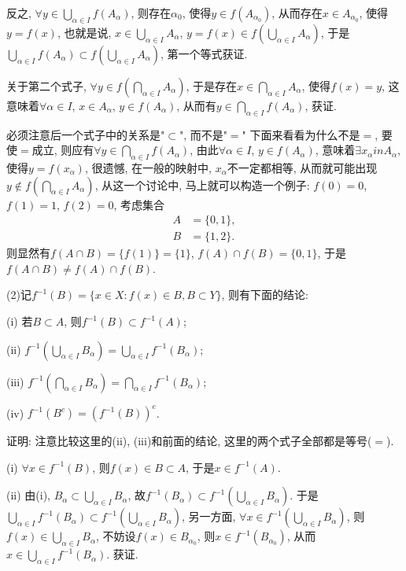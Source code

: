 \documentclass[12pt,a4paper,openany]{book}
\begin{document}
反之, $\forall y \in \bigcup\limits_{\alpha \in I}{f(A_{\alpha})}$, 则存在$\alpha_0$, 使得$y \in f(A_{\alpha_0})$, 从而存在$x \in A_{\alpha_0}$, 使得$y = f(x)$, 也就是说, $x \in \bigcup\limits_{\alpha \in I}{A_{\alpha}}$, $y = f(x) \in f(\bigcup\limits_{\alpha \in I}{A_{\alpha}})$, 于是$\bigcup\limits_{\alpha \in I}{f(A_{\alpha})} \subset f(\bigcup\limits_{\alpha \in I}{A_{\alpha}})$, 第一个等式获证.

关于第二个式子, $\forall y \in f(\bigcap\limits_{\alpha \in I}{A_{\alpha}})$, 于是存在$x \in \bigcap\limits_{\alpha \in I}{A_{\alpha}}$, 使得$f(x) = y$, 这意味着$\forall \alpha \in I$, $x \in A_{\alpha}$, $y \in f(A_{\alpha})$, 从而有$y \in \bigcap\limits_{\alpha \in I}{f(A_{\alpha})}$, 获证.

必须注意后一个式子中的关系是"$\subset$", 而不是"$=$" 下面来看看为什么不是$=$, 要使$=$成立, 则应有$\forall y \in \bigcap\limits_{\alpha \in I}{f(A_{\alpha})}$, 由此$\forall \alpha \in I$, $y \in f(A_{\alpha})$, 意味着$\exists x_{\alpha} in A_{\alpha}$, 使得$y = f(x_{\alpha})$, 很遗憾, 在一般的映射中, $x_{\alpha}$不一定都相等, 从而就可能出现$y \notin f(\bigcap\limits_{\alpha \in I}{A_{\alpha}})$, 从这一个讨论中, 马上就可以构造一个例子: $f(0) = 0$, $f(1) = 1$, $f(2) = 0$, 考虑集合
$$
\begin{aligned}
A & = \{0, 1\}, \\
B &= \{1, 2\}.
\end{aligned}
$$
则显然有$f(A \cap B) = \{f(1)\} = \{1\}$, $f(A) \cap f(B) = \{0, 1\}$, 于是$f(A \cap B) \neq f(A) \cap f(B)$.

(2)记$f^{-1}(B) = \{x \in X: f(x) \in B, B \subset Y\}$, 则有下面的结论:

(i) 若$B \subset A$, 则$f^{-1}(B) \subset f^{-1}(A)$;

(ii) $f^{-1}(\bigcup\limits_{\alpha \in I}{B_{\alpha}}) = \bigcup\limits_{\alpha \in I}{f^{-1}(B_{\alpha})}$;

(iii) $f^{-1}(\bigcap\limits_{\alpha \in I}{B_{\alpha}}) = \bigcap\limits_{\alpha \in I}{f^{-1}(B_{\alpha})}$;

(iv) $f^{-1}(B^c) = (f^{-1}(B))^c$.

证明: 注意比较这里的(ii), (iii)和前面的结论, 这里的两个式子全部都是等号($=$).

(i) $\forall x \in f^{-1}(B)$, 则$f(x) \in B \subset A$, 于是$x \in f^{-1}(A)$.

(ii) 由(i), $B_{\alpha} \subset \bigcup\limits_{\alpha \in I}{B_{\alpha}}$, 故$f^{-1}(B_{\alpha}) \subset f^{-1}(\bigcup\limits_{\alpha \in I}{B_{\alpha}})$. 于是$\bigcup\limits_{\alpha \in I}{f^{-1}(B_{\alpha})} \subset f^{-1}(\bigcup\limits_{\alpha \in I}{B_{\alpha}})$, 另一方面, $\forall x \in f^{-1}(\bigcup\limits_{\alpha \in I}{B_{\alpha}})$, 则$f(x) \in \bigcup\limits_{\alpha \in I}{B_{\alpha}}$, 不妨设$f(x) \in B_{\alpha_0}$, 则$x \in f^{-1}(B_{\alpha_0})$, 从而$x \in \bigcup\limits_{\alpha \in I}{f^{-1}(B_{\alpha})}$. 获证.
\end{document}
